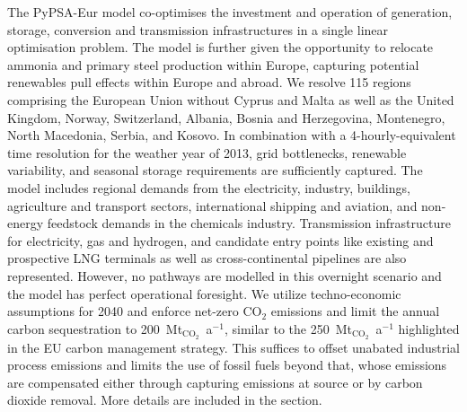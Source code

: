 The PyPSA-Eur\cite{PyPSAEurSecSectorCoupledOpen} model co-optimises the investment
and operation of generation, storage, conversion and transmission
infrastructures in a single linear optimisation problem. The model is further
given the opportunity to relocate ammonia and primary steel production within
Europe, capturing potential renewables pull effects within Europe and
abroad.\cite{verpoortImpactGlobalHeterogeneity2024,
samadiRenewablesPullEffect2023,egererIndustryTransformationFossil2024} We
resolve 115 regions comprising the European Union without Cyprus and Malta as
well as the United Kingdom, Norway, Switzerland, Albania, Bosnia and
Herzegovina, Montenegro, North Macedonia, Serbia, and Kosovo. In combination
with a 4-hourly-equivalent time resolution for the weather year of 2013, grid
bottlenecks, renewable variability, and seasonal storage requirements are
sufficiently captured. The  model includes regional demands from the
electricity, industry, buildings, agriculture and transport sectors,
international shipping and aviation, and non-energy feedstock demands in the
chemicals industry. Transmission infrastructure for electricity, gas and
hydrogen, and candidate entry points like existing and prospective LNG terminals
as well as cross-continental pipelines are also represented.  However, no
pathways are modelled in this overnight scenario and the model has perfect
operational foresight. We utilize techno-economic assumptions for 2040 and
enforce net-zero CO$_2$ emissions and limit the annual carbon sequestration to
200~Mt$_{\text{CO}_2}$~a$^{-1}$, similar to the 250~Mt$_{\text{CO}_2}$~a$^{-1}$
highlighted in the EU carbon management
strategy.\cite{europeancommissionAmbitiousIndustrialCarbon2024} This suffices to
offset unabated industrial process emissions and limits the use of fossil fuels
beyond that, whose emissions are compensated either through capturing emissions
at source or by carbon dioxide removal. More details are included in the
 section.
